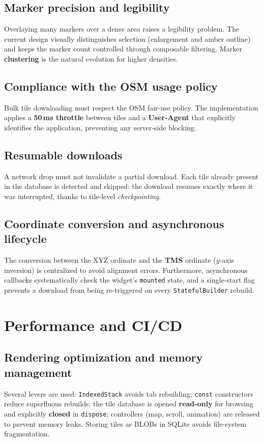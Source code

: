 \documentclass[11pt,a4paper]{article}
\newcommand{\code}[1]{\texttt{#1}}
\begin{document}
\subsection{Marker precision and legibility}
Overlaying many markers over a dense area raises a legibility problem. The
current design visually distinguishes selection (enlargement and amber outline)
and keeps the marker count controlled through composable filtering. Marker
\textbf{clustering} is the natural evolution for higher densities.

\subsection{Compliance with the OSM usage policy}
Bulk tile downloading must respect the OSM fair-use policy. The implementation
applies a \textbf{50\,ms throttle} between tiles and a \textbf{User-Agent} that
explicitly identifies the application, preventing any server-side blocking.

\subsection{Resumable downloads}
A network drop must not invalidate a partial download. Each tile already present
in the database is detected and skipped: the download resumes exactly where it
was interrupted, thanks to tile-level \emph{checkpointing}.

\subsection{Coordinate conversion and asynchronous lifecycle}
The conversion between the XYZ ordinate and the \textbf{TMS} ordinate ($y$-axis
inversion) is centralized to avoid alignment errors. Furthermore, asynchronous
callbacks systematically check the widget's \code{mounted} state, and a
single-start flag prevents a download from being re-triggered on every
\code{StatefulBuilder} rebuild.

\section{Performance and CI/CD}
\subsection{Rendering optimization and memory management}
Several levers are used: \code{IndexedStack} avoids tab rebuilding; \code{const}
constructors reduce superfluous rebuilds; the tile database is opened
\textbf{read-only} for browsing and explicitly \textbf{closed} in \code{dispose};
controllers (map, scroll, animation) are released to prevent memory leaks.
Storing tiles as BLOBs in SQLite avoids file-system fragmentation.
\end{document}
